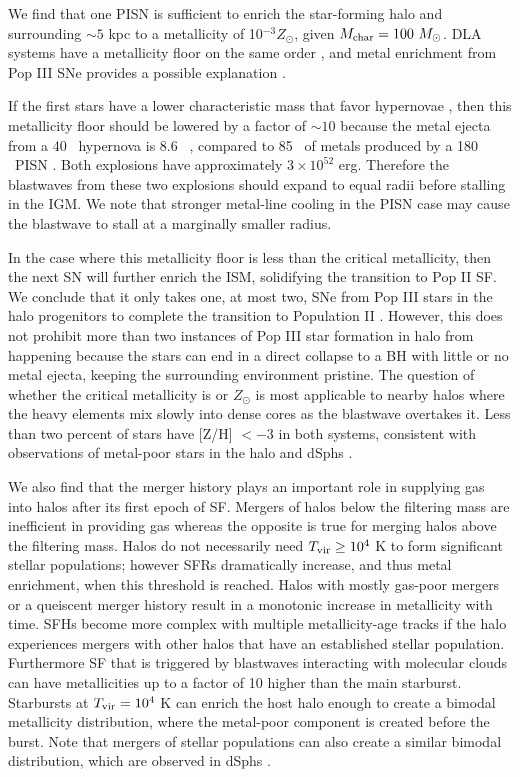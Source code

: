 \documentclass[apjl]{emulateapj}
\begin{document}
We find that one PISN is sufficient to enrich the star-forming halo
and surrounding $\sim 5$ kpc to a metallicity of 10$^{-3} Z_\odot$,
given $M_{\rm char} = 100~\Ms$.  DLA systems have a metallicity floor
on the same order \citep{Wolfe05_Review}, and metal enrichment from Pop
III SNe provides a possible explanation \citep{Kobayashi11}.

If the first stars have a lower characteristic mass that favor
hypernovae \citep{Tumlinson07_IMF}, then this metallicity floor should
be lowered by a factor of $\sim 10$ because the metal ejecta from a 40
\Ms~hypernova is 8.6 \Ms~\citep{Nomoto06}, compared to 85 \Ms~of
metals produced by a 180 \Ms~PISN \citep{Heger02}.  Both explosions
have approximately $3 \times 10^{52}$ erg.  Therefore the blastwaves
from these two explosions should expand to equal radii before stalling
in the IGM.  We note that stronger metal-line cooling in the PISN case
may cause the blastwave to stall at a marginally smaller radius.  

In the case where this metallicity floor is less than the critical
metallicity, then the next SN will further enrich the ISM, solidifying
the transition to Pop II SF.  We conclude that it only takes one, at
most two, SNe from Pop III stars in the halo progenitors to complete
the transition to Population II \citep{Frebel10}.  However, this does
not prohibit more than two instances of Pop III star formation in halo
from happening because the stars can end in a direct collapse to a BH
with little or no metal ejecta, keeping the surrounding environment
pristine.  The question of whether the critical metallicity is
 or  $Z_\odot$ is most applicable to nearby
halos where the heavy elements mix slowly into dense cores as the
blastwave overtakes it.  Less than two percent of stars have [Z/H] $<
-3$ in both systems, consistent with observations of metal-poor stars
in the halo and dSphs \citep{Beers05, Battaglia10}.

We also find that the merger history plays an important role in
supplying gas into halos after its first epoch of SF.  Mergers of
halos below the filtering mass are inefficient in providing gas
whereas the opposite is true for merging halos above the filtering
mass.  Halos do not necessarily need $\tvir \ge 10^4$ K to form
significant stellar populations; however SFRs dramatically increase,
and thus metal enrichment, when this threshold is reached.  Halos with
mostly gas-poor mergers or a queiscent merger history result in a
monotonic increase in metallicity with time.  SFHs become more complex
with multiple metallicity-age tracks if the halo experiences mergers
with other halos that have an established stellar population.
Furthermore SF that is triggered by blastwaves interacting with
molecular clouds can have metallicities up to a factor of 10 higher
than the main starburst.  Starbursts at $\tvir = 10^4$ K can enrich
the host halo enough to create a bimodal metallicity distribution,
where the metal-poor component is created before the burst.  Note that
mergers of stellar populations can also create a similar bimodal
distribution, which are observed in dSphs \cite{Battaglia10}.
\end{document}
